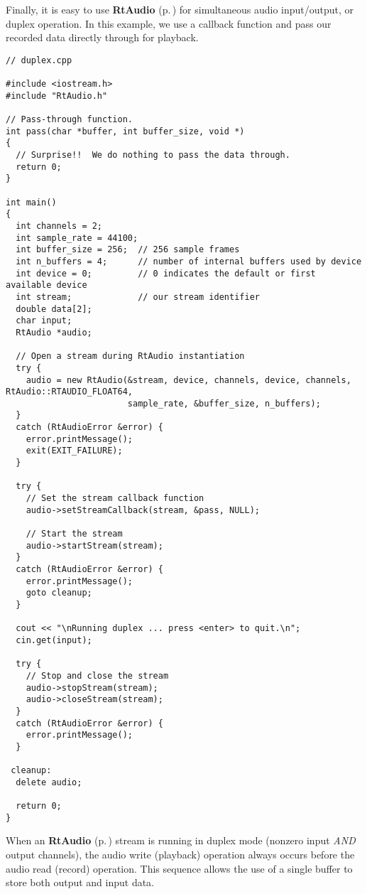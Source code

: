Finally, it is easy to use {\bf Rt\-Audio} {\rm (p.\,\pageref{classRtAudio})} for simultaneous audio input/output, or duplex operation. In this example, we use a callback function and pass our recorded data directly through for playback.

\footnotesize\begin{verbatim}// duplex.cpp

#include <iostream.h>
#include "RtAudio.h"

// Pass-through function.
int pass(char *buffer, int buffer_size, void *)
{
  // Surprise!!  We do nothing to pass the data through.
  return 0;
}

int main()
{
  int channels = 2;
  int sample_rate = 44100;
  int buffer_size = 256;  // 256 sample frames
  int n_buffers = 4;      // number of internal buffers used by device
  int device = 0;         // 0 indicates the default or first available device
  int stream;             // our stream identifier
  double data[2];
  char input;
  RtAudio *audio;

  // Open a stream during RtAudio instantiation
  try {
    audio = new RtAudio(&stream, device, channels, device, channels, RtAudio::RTAUDIO_FLOAT64,
                        sample_rate, &buffer_size, n_buffers);
  }
  catch (RtAudioError &error) {
    error.printMessage();
    exit(EXIT_FAILURE);
  }

  try {
    // Set the stream callback function
    audio->setStreamCallback(stream, &pass, NULL);

    // Start the stream
    audio->startStream(stream);
  }
  catch (RtAudioError &error) {
    error.printMessage();
    goto cleanup;
  }

  cout << "\nRunning duplex ... press <enter> to quit.\n";
  cin.get(input);

  try {
    // Stop and close the stream
    audio->stopStream(stream);
    audio->closeStream(stream);
  }
  catch (RtAudioError &error) {
    error.printMessage();
  }

 cleanup:
  delete audio;

  return 0;
}\end{verbatim}\normalsize 


When an {\bf Rt\-Audio} {\rm (p.\,\pageref{classRtAudio})} stream is running in duplex mode (nonzero input {\em AND} output channels), the audio write (playback) operation always occurs before the audio read (record) operation. This sequence allows the use of a single buffer to store both output and input data.

